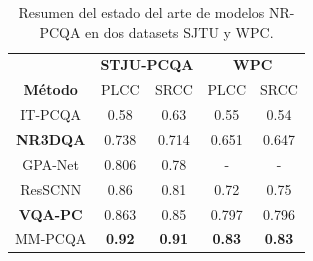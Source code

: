 \begin{frame}
\begin{columns}
      \begin{table}[htp]
          \footnotesize
          \centering
          \begin{tabular}{|c|c|c|c|c|}
              \hline
              \rowcolor[HTML]{FFC702}
              \cellcolor[HTML]{FFC702} & \multicolumn{2}{c|}{\cellcolor[HTML]{FFC702}\textbf{STJU-PCQA}} & \multicolumn{2}{c|}{\cellcolor[HTML]{FFC702}\textbf{WPC}} \\ 
              \cline{2-5}
             \multirow{-2}{*}{\cellcolor[HTML]{FFC702}\textbf{Método}}  &\multicolumn{1}{c|}{\cellcolor[HTML]{FFC702} PLCC} & \multicolumn{1}{c|}{\cellcolor[HTML]{FFC702}SRCC} & \multicolumn{1}{c|}{\cellcolor[HTML]{FFC702}PLCC} & \multicolumn{1}{c|}{\cellcolor[HTML]{FFC702}SRCC} \\
              \hline
              IT-PCQA & 0.58 & 0.63 & 0.55  & 0.54\\
              \hline
              \textbf<2->{NR3DQA} & 0.738 & 0.714 & 0.651 & 0.647\\
              \hline
              GPA-Net & 0.806 & 0.78 & - & - \\
              \hline
              ResSCNN & 0.86 & 0.81 & 0.72 & 0.75\\
              \hline
              \textbf<3->{VQA-PC} & 0.863 & 0.85 & 0.797 & 0.796\\
              \hline
              MM-PCQA & \textbf{0.92} & \textbf{0.91} & \textbf{0.83} & \textbf{0.83}\\
              \hline
          \end{tabular}
          \caption[Estado del arte de modelos NR-PCQA]{
          Resumen del estado del arte de modelos NR-PCQA en dos datasets SJTU y WPC.
        }
      \end{table}
  \end{columns}
\end{frame}

